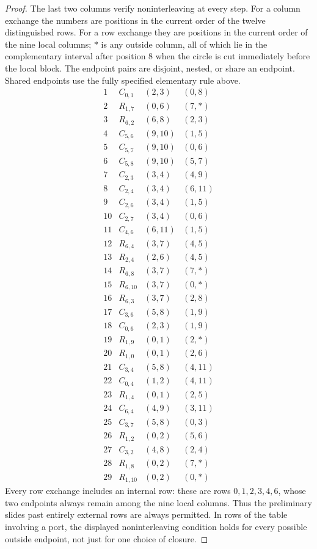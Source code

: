 \documentclass[11pt,a4paper]{article}
\theoremstyle{remark}
\begin{document}
\begin{proof}
The last two columns verify noninterleaving at every step.  For a column
exchange the numbers are positions in the current order of the twelve
distinguished rows.  For a row exchange they are positions in the
current order of the nine local columns; $*$ is any outside column, all
of which lie in the complementary interval after position $8$ when
the circle is cut immediately before the local block.  The endpoint
pairs are disjoint, nested, or share an endpoint.  Shared endpoints use
the fully specified elementary rule above.
\[
\begin{array}{r|c|c|c}
1&C_{0,1}&(2,3)&(0,8)\\
2&R_{1,7}&(0,6)&(7,*)\\
3&R_{6,2}&(6,8)&(2,3)\\
4&C_{5,6}&(9,10)&(1,5)\\
5&C_{5,7}&(9,10)&(0,6)\\
6&C_{5,8}&(9,10)&(5,7)\\
7&C_{2,3}&(3,4)&(4,9)\\
8&C_{2,4}&(3,4)&(6,11)\\
9&C_{2,6}&(3,4)&(1,5)\\
10&C_{2,7}&(3,4)&(0,6)\\
11&C_{4,6}&(6,11)&(1,5)\\
12&R_{6,4}&(3,7)&(4,5)\\
13&R_{2,4}&(2,6)&(4,5)\\
14&R_{6,8}&(3,7)&(7,*)\\
15&R_{6,10}&(3,7)&(0,*)\\
16&R_{6,3}&(3,7)&(2,8)\\
17&C_{3,6}&(5,8)&(1,9)\\
18&C_{0,6}&(2,3)&(1,9)\\
19&R_{1,9}&(0,1)&(2,*)\\
20&R_{1,0}&(0,1)&(2,6)\\
21&C_{3,4}&(5,8)&(4,11)\\
22&C_{0,4}&(1,2)&(4,11)\\
23&R_{1,4}&(0,1)&(2,5)\\
24&C_{6,4}&(4,9)&(3,11)\\
25&C_{3,7}&(5,8)&(0,3)\\
26&R_{1,2}&(0,2)&(5,6)\\
27&C_{3,2}&(4,8)&(2,4)\\
28&R_{1,8}&(0,2)&(7,*)\\
29&R_{1,10}&(0,2)&(0,*)
\end{array}
\]
Every row exchange includes an internal row: these are rows
$0,1,2,3,4,6$, whose two endpoints always remain among the nine local
columns.  Thus the preliminary slides past entirely external rows are
always permitted.  In rows of the table involving a port, the displayed
noninterleaving condition holds for every possible outside endpoint,
not just for one choice of closure.


\end{proof}
\end{document}
